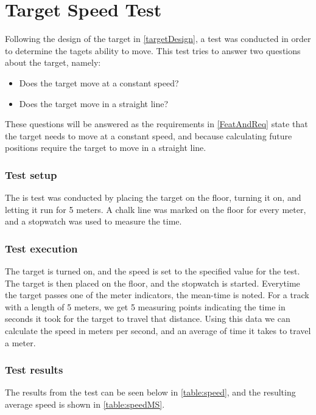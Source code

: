 \chapter{Target Speed Test}\label{speedotesto}
Following the design of the target in \autoref{targetDesign}, a test was
conducted in order to determine the tagets ability to move. This test tries to
answer two questions about the target, namely:
\begin{itemize}
  \item Does the target move at a constant speed?
  \item Does the target move in a straight line?
\end{itemize}

These questions will be answered as the requirements in \autoref{FeatAndReq}
state that the target needs to move at a constant speed, and because calculating
future positions require the target to move in a straight line.

\subsection{Test setup}
The is test was conducted by placing the target on the floor, turning it on, and
letting it run for 5 meters. A chalk line was marked on the floor for every
meter, and a stopwatch was used to measure the time.

\subsection{Test execution}
The target is turned on, and the speed is set to the specified value for the
test. The target is then placed on the floor, and the stopwatch is started.
Everytime the target passes one of the meter indicators, the mean-time is noted.
For a track with a length of 5 meters, we get 5 measuring points indicating the
time in seconds it took for the target to travel that distance. Using this data
we can calculate the speed in meters per second, and an average of time it
takes to travel a meter.

\subsection{Test results}
The results from the test can be seen below in \autoref{table:speed}, and the
resulting average speed is shown in \autoref{table:speedMS}. 


